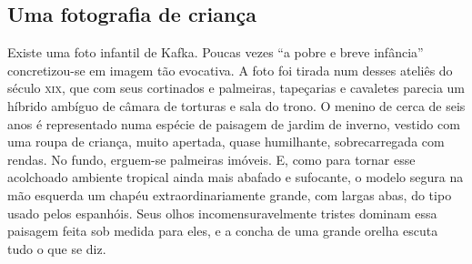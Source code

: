 \subsection{Uma fotografia de criança}

Existe uma foto infantil de Kafka. Poucas vezes ``a pobre e breve
infância'' concretizou-se em imagem tão evocativa. A foto foi tirada num
desses ateliês do século \textsc{xix}, que com seus cortinados e palmeiras,
tapeçarias e cavaletes parecia um híbrido ambíguo de câmara de torturas
e sala do trono. O menino de cerca de seis anos é representado numa
espécie de paisagem de jardim de inverno, vestido com uma roupa de
criança, muito apertada, quase humilhante, sobrecarregada com rendas. No
fundo, erguem-se palmeiras imóveis. E, como para tornar esse acolchoado
ambiente tropical ainda mais abafado e sufocante, o modelo segura na mão
esquerda um chapéu extraordinariamente grande, com largas abas, do tipo
usado pelos espanhóis. Seus olhos incomensuravelmente tristes dominam
essa paisagem feita sob medida para eles, e a concha de uma grande
orelha escuta tudo o que se diz.


